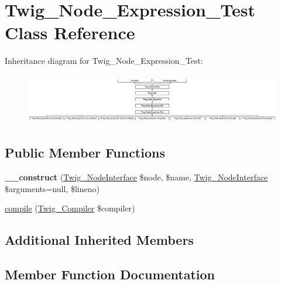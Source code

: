 \hypertarget{class_twig___node___expression___test}{}\section{Twig\+\_\+\+Node\+\_\+\+Expression\+\_\+\+Test Class Reference}
\label{class_twig___node___expression___test}
Inheritance diagram for Twig\+\_\+\+Node\+\_\+\+Expression\+\_\+\+Test\+:\begin{figure}[H]
\begin{center}
\leavevmode
\includegraphics[height=2.231076cm]{class_twig___node___expression___test}
\end{center}
\end{figure}
\subsection*{Public Member Functions}
\begin{DoxyCompactItemize}
\item 
\hypertarget{class_twig___node___expression___test_a341762e0b4ca6e93e6bfd4cc2f7a0b0b}{}{\bfseries \+\_\+\+\_\+construct} (\hyperlink{interface_twig___node_interface}{Twig\+\_\+\+Node\+Interface} \$node, \$name, \hyperlink{interface_twig___node_interface}{Twig\+\_\+\+Node\+Interface} \$arguments=null, \$lineno)\label{class_twig___node___expression___test_a341762e0b4ca6e93e6bfd4cc2f7a0b0b}

\item 
\hyperlink{class_twig___node___expression___test_a4e0faa87c3fae583620b84d3607085da}{compile} (\hyperlink{class_twig___compiler}{Twig\+\_\+\+Compiler} \$compiler)
\end{DoxyCompactItemize}
\subsection*{Additional Inherited Members}


\subsection{Member Function Documentation}
\hypertarget{class_twig___node___expression___test_a4e0faa87c3fae583620b84d3607085da}{}

